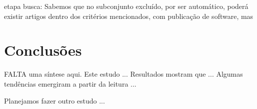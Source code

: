 etapa busca: Sabemos que no subconjunto excluído, por ser automático, poderá existir artigos
dentro dos critérios mencionados, com publicação de software, mas 

\section{Conclusões} \label{estudo1:conclusoes}

FALTA uma síntese aqui. 
Este estudo ...
Resultados mostram que ...
Algumas tendências emergiram a partir da leitura ...

Planejamos fazer outro estudo ... 



